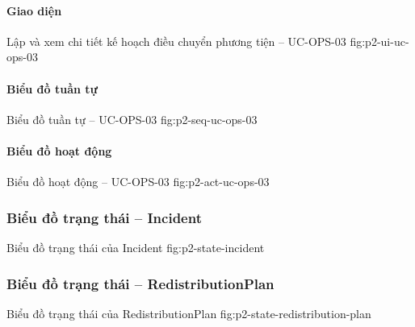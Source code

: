 \par\medskip
\noindent\begin{minipage}{\linewidth}
\paragraph{Giao diện}
  {Lập và xem chi tiết kế hoạch điều chuyển phương tiện -- UC-OPS-03}
  {fig:p2-ui-uc-ops-03}
  {}
\end{minipage}\par

\clearpage
\paragraph{Biểu đồ tuần tự}
  {Biểu đồ tuần tự -- UC-OPS-03}
  {fig:p2-seq-uc-ops-03}

\clearpage
\paragraph{Biểu đồ hoạt động}
  {Biểu đồ hoạt động -- UC-OPS-03}
  {fig:p2-act-uc-ops-03}

\clearpage



\subsubsection{Biểu đồ trạng thái -- Incident}

  {Biểu đồ trạng thái của Incident}
  {fig:p2-state-incident}

\clearpage

\subsubsection{Biểu đồ trạng thái -- RedistributionPlan}

  {Biểu đồ trạng thái của RedistributionPlan}
  {fig:p2-state-redistribution-plan}

\clearpage
